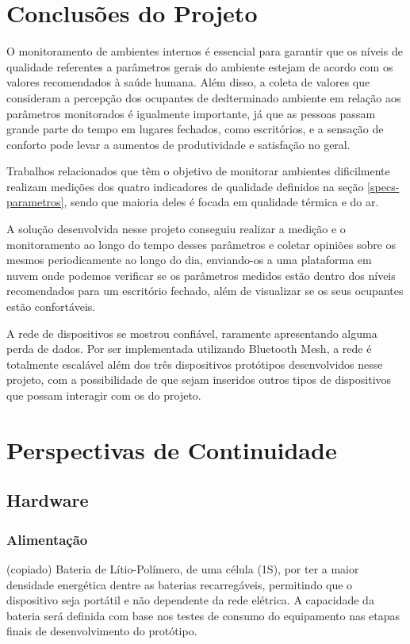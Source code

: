 \documentclass[../monografia.tex]{subfiles}
\begin{document}
\section{Conclusões do Projeto}

O monitoramento de ambientes internos é essencial para garantir que os níveis de qualidade referentes a parâmetros gerais do ambiente estejam de acordo com os valores recomendados à saúde humana. Além disso, a coleta de valores que consideram a percepção dos ocupantes de dedterminado ambiente em relação aos parâmetros monitorados é igualmente importante, já que as pessoas passam grande parte do tempo em lugares fechados, como escritórios, e a sensação de conforto pode levar a aumentos de produtividade e satisfação no geral.

Trabalhos relacionados que têm o objetivo de monitorar ambientes dificilmente realizam medições dos quatro indicadores de qualidade definidos na seção \ref{specs-parametros}, sendo que maioria deles é focada em qualidade térmica e do ar.

A solução desenvolvida nesse projeto conseguiu realizar a medição e o monitoramento ao longo do tempo desses parâmetros e coletar opiniões sobre os mesmos periodicamente ao longo do dia, enviando-os a uma plataforma em nuvem onde podemos verificar se os parâmetros medidos estão dentro dos níveis recomendados para um escritório fechado, além de visualizar se os seus ocupantes estão confortáveis.

A rede de dispositivos se mostrou confiável, raramente apresentando alguma perda de dados. Por ser implementada utilizando Bluetooth Mesh, a rede é totalmente escalável além dos três dispositivos protótipos desenvolvidos nesse projeto, com a possibilidade de que sejam inseridos outros tipos de dispositivos que possam interagir com os do projeto. 



\section{Perspectivas de Continuidade}
\subsection{Hardware}
\subsubsection{Alimentação}
(copiado)
Bateria de Lítio-Polímero, de uma célula (1S), por ter a maior densidade energética dentre as baterias recarregáveis, permitindo que o dispositivo seja portátil e não dependente da rede elétrica. A capacidade da bateria será definida com base nos testes de consumo do equipamento nas etapas finais de desenvolvimento do protótipo. 
\end{document}
